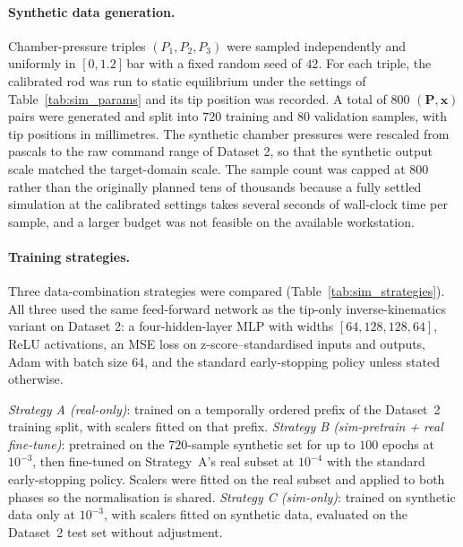 \paragraph{Synthetic data generation.}
Chamber-pressure triples $(P_1, P_2, P_3)$ were sampled independently and uniformly in $[0, 1.2]$\,bar with a fixed random seed of $42$. For each triple, the calibrated rod was run to static equilibrium under the settings of Table~\ref{tab:sim_params} and its tip position was recorded. A total of $800$ $(\mathbf{P}, \mathbf{x})$ pairs were generated and split into $720$ training and $80$ validation samples, with tip positions in millimetres. The synthetic chamber pressures were rescaled from pascals to the raw command range of Dataset 2, so that the synthetic output scale matched the target-domain scale. The sample count was capped at $800$ rather than the originally planned tens of thousands because a fully settled simulation at the calibrated settings takes several seconds of wall-clock time per sample, and a larger budget was not feasible on the available workstation.

\paragraph{Training strategies.}
Three data-combination strategies were compared (Table~\ref{tab:sim_strategies}). All three used the same feed-forward network as the tip-only inverse-kinematics variant on Dataset 2: a four-hidden-layer MLP with widths $[64, 128, 128, 64]$, ReLU activations, an MSE loss on z-score--standardised inputs and outputs, Adam with batch size $64$, and the standard early-stopping policy unless stated otherwise.

\emph{Strategy A (real-only)}: trained on a temporally ordered prefix of the Dataset~2 training split, with scalers fitted on that prefix. \emph{Strategy B (sim-pretrain + real fine-tune)}: pretrained on the $720$-sample synthetic set for up to $100$ epochs at $10^{-3}$, then fine-tuned on Strategy~A's real subset at $10^{-4}$ with the standard early-stopping policy. Scalers were fitted on the real subset and applied to both phases so the normalisation is shared. \emph{Strategy C (sim-only)}: trained on synthetic data only at $10^{-3}$, with scalers fitted on synthetic data, evaluated on the Dataset~2 test set without adjustment.

